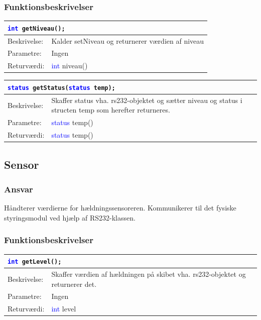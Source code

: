 \subsubsection{Funktionsbeskrivelser}

\begin{table}[H]
\begin{tabular}{l p{12.5cm}}
\multicolumn{2}{l}{\texttt{\textcolor{blue}{int} getNiveau();}} \\
\hline
Beskrivelse: &Kalder setNiveau og returnerer værdien af niveau\\
Parametre:&Ingen\\
Returværdi:&\textcolor{blue}{int} niveau()\\
\end{tabular}
\end{table}

\begin{table}[H]
\begin{tabular}{l p{12.5cm}}
\multicolumn{2}{l}{\texttt{\textcolor{blue}{status} getStatus(\textcolor{blue}{status} temp);}} \\
\hline
Beskrivelse: &Skaffer status vha. rs232-objektet og sætter niveau og status i structen temp som herefter returneres.\\
Parametre:&\textcolor{blue}{status} temp()\\
Returværdi:&\textcolor{blue}{status} temp()\\
\end{tabular}
\end{table}

\subsection{Sensor}
\subsubsection{Ansvar}
Håndterer værdierne for hældningssensoreren. Kommunikerer til det fysiske styringsmodul ved hjælp af RS232-klassen.
\subsubsection{Funktionsbeskrivelser}

\begin{table}[H]
\begin{tabular}{l p{12.5cm}}
\multicolumn{2}{l}{\texttt{\textcolor{blue}{int} getLevel();}} \\
\hline
Beskrivelse: &Skaffer værdien af hældningen på skibet vha. rs232-objektet og returnerer det.\\
Parametre:&Ingen\\
Returværdi:&\textcolor{blue}{int} level\\
\end{tabular}
\end{table}

